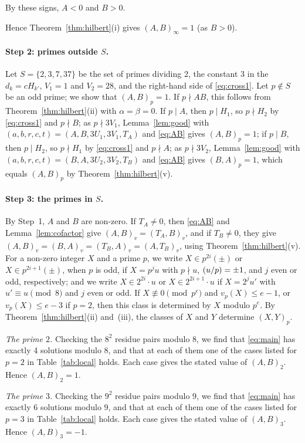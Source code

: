 \documentclass[11pt]{article}
\newcommand{\leg}[2]{\mathchoice{\biggl(\dfrac{#1}{#2}\biggr)}{(#1/#2)}{(#1/#2)}{(#1/#2)}}
\begin{document}
By these signs, $A<0$ and $B>0$.

Hence Theorem~\ref{thm:hilbert}(i) gives $(A,B)_\infty=1$ (as $B>0$).

\paragraph{Step 2: primes outside $S$.} Let $S=\{2,3,7,37\}$ be the set of primes dividing $2$, the constant $3$ in the $d_k=cH_{k'}$, $V_{1}=1$ and $V_{2}=28$, and the right-hand side of \eqref{eq:cross1}. Let $p\notin S$ be an odd prime; we show that $(A,B)_p=1$. If $p\nmid AB$, this follows from Theorem~\ref{thm:hilbert}(ii) with $\alpha=\beta=0$. If $p\mid A$, then $p\mid H_{1}$, so $p\nmid H_{2}$ by \eqref{eq:cross1} and $p\nmid B$; as $p\nmid 3V_{1}$, Lemma~\ref{lem:good} with $(a,b,r,c,t)=(A,B,3U_{1},3V_{1},T_A)$ and \eqref{eq:AB} gives $(A,B)_p=1$; if $p\mid B$, then $p\mid H_{2}$, so $p\nmid H_{1}$ by \eqref{eq:cross1} and $p\nmid A$; as $p\nmid 3V_{2}$, Lemma~\ref{lem:good} with $(a,b,r,c,t)=(B,A,3U_{2},3V_{2},T_B)$ and \eqref{eq:AB} gives $(B,A)_p=1$, which equals $(A,B)_p$ by Theorem~\ref{thm:hilbert}(v).

\paragraph{Step 3: the primes in $S$.} By Step~1, $A$ and $B$ are non-zero. If $T_A\neq0$, then \eqref{eq:AB} and Lemma~\ref{lem:cofactor} give $(A,B)_v=(T_A,B)_v$, and if $T_B\neq0$, they give $(A,B)_v=(B,A)_v=(T_B,A)_v=(A,T_B)_v$, using Theorem~\ref{thm:hilbert}(v). For a non-zero integer $X$ and a prime $p$, we write $X\in p^{2i}(\pm)$ or $X\in p^{2i+1}(\pm)$, when $p$ is odd, if $X=p^ju$ with $p\nmid u$, $\leg{u}{p}=\pm1$, and $j$ even or odd, respectively; and we write $X\in2^{2i}\cdot u$ or $X\in2^{2i+1}\cdot u$ if $X=2^ju'$ with $u'\equiv u\pmod 8$ and $j$ even or odd. If $X\not\equiv0\pmod{p^e}$ and $v_p(X)\leq e-1$, or $v_p(X)\leq e-3$ if $p=2$, then this class is determined by $X$ modulo $p^e$. By Theorem~\ref{thm:hilbert}(ii) and~(iii), the classes of $X$ and $Y$ determine $(X,Y)_p$.

\emph{The prime $2$.} Checking the $8^2$ residue pairs modulo $8$, we find that \eqref{eq:main} has exactly 4 solutions modulo $8$, and that at each of them one of the cases listed for $p=2$ in Table~\ref{tab:local} holds. Each case gives the stated value of $(A,B)_{2}$. Hence $(A,B)_{2}=1$.

\emph{The prime $3$.} Checking the $9^2$ residue pairs modulo $9$, we find that \eqref{eq:main} has exactly 6 solutions modulo $9$, and that at each of them one of the cases listed for $p=3$ in Table~\ref{tab:local} holds. Each case gives the stated value of $(A,B)_{3}$. Hence $(A,B)_{3}=-1$.
\end{document}
